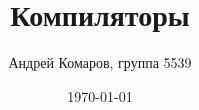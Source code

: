 \documentclass{article}
\begin{document}
\title{Компиляторы}
\author{Андрей Комаров, группа 5539}
\date{\today}
\maketitle


\end{document}
